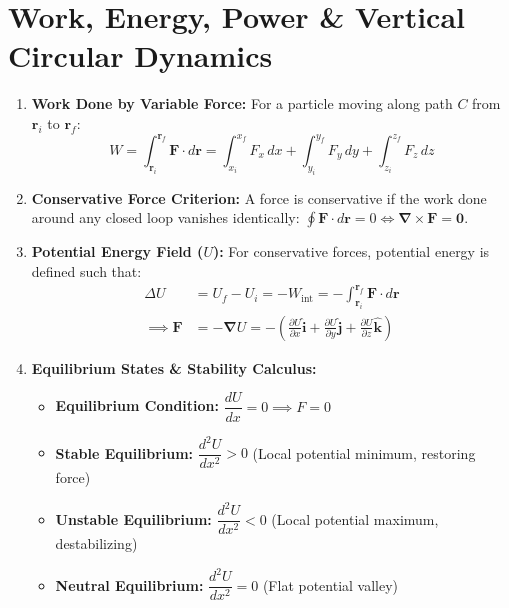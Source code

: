 \documentclass[10pt,twoside,openright]{book}
\begin{document}
\section{Work, Energy, Power \& Vertical Circular Dynamics}

\begin{conceptbox}
\begin{enumerate}[leftmargin=*]
  \item \textbf{Work Done by Variable Force:} For a particle moving along path $C$ from $\mathbf{r}_i$ to $\mathbf{r}_f$:
  \begin{equation}
    W = \int_{\mathbf{r}_i}^{\mathbf{r}_f} \mathbf{F} \cdot d\mathbf{r} = \int_{x_i}^{x_f} F_x\,dx + \int_{y_i}^{y_f} F_y\,dy + \int_{z_i}^{z_f} F_z\,dz
  \end{equation}
  \item \textbf{Conservative Force Criterion:} A force is conservative if the work done around any closed loop vanishes identically: $\oint \mathbf{F}\cdot d\mathbf{r} = 0 \iff \boldsymbol{\nabla}\times\mathbf{F} = \mathbf{0}$.
  \item \textbf{Potential Energy Field ($U$):} For conservative forces, potential energy is defined such that:
  \begin{align}
    \Delta U &= U_f - U_i = -W_{\text{int}} = -\int_{\mathbf{r}_i}^{\mathbf{r}_f} \mathbf{F}\cdot d\mathbf{r} \\
    \implies \mathbf{F} &= -\boldsymbol{\nabla}U = -\left(\frac{\partial U}{\partial x}\hat{\mathbf{i}} + \frac{\partial U}{\partial y}\hat{\mathbf{j}} + \frac{\partial U}{\partial z}\hat{\mathbf{k}}\right)
  \end{align}
  \item \textbf{Equilibrium States \& Stability Calculus:}
  \begin{itemize}[leftmargin=1.2em, itemsep=2pt]
    \item \textbf{Equilibrium Condition:} $\dfrac{dU}{dx} = 0 \implies F = 0$
    \item \textbf{Stable Equilibrium:} $\dfrac{d^2 U}{dx^2} > 0$ (Local potential minimum, restoring force)
    \item \textbf{Unstable Equilibrium:} $\dfrac{d^2 U}{dx^2} < 0$ (Local potential maximum, destabilizing)
    \item \textbf{Neutral Equilibrium:} $\dfrac{d^2 U}{dx^2} = 0$ (Flat potential valley)
  \end{itemize}
\end{enumerate}
\end{conceptbox}
\end{document}
